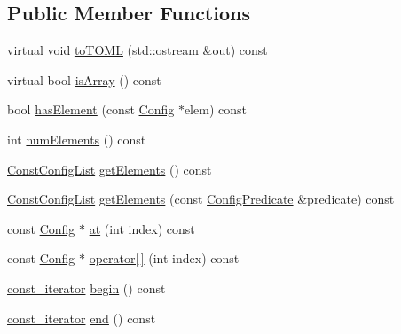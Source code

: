 \subsection*{Public Member Functions}
\begin{DoxyCompactItemize}
\item 
virtual void \hyperlink{classtheoria_1_1config_1_1ConfigArray_a1c73dba526ebd747682bc961676f5158}{to\+T\+O\+ML} (std\+::ostream \&out) const
\item 
virtual bool \hyperlink{classtheoria_1_1config_1_1ConfigArray_aa225cf405229bccfcfdf2042e44da4f7}{is\+Array} () const
\item 
bool \hyperlink{classtheoria_1_1config_1_1ConfigArray_a61157dd8ee35ba02a64859d5ccf59ba6}{has\+Element} (const \hyperlink{classtheoria_1_1config_1_1Config}{Config} $\ast$elem) const
\item 
int \hyperlink{classtheoria_1_1config_1_1ConfigArray_a8482627e5891b1c15f177f5118ec484d}{num\+Elements} () const
\item 
\hyperlink{classtheoria_1_1config_1_1Config_a61230728ffa4d92667a536c8c0f0ca30}{Const\+Config\+List} \hyperlink{classtheoria_1_1config_1_1ConfigArray_a91bf929f72cc8eeb399df049c5008898}{get\+Elements} () const
\item 
\hyperlink{classtheoria_1_1config_1_1Config_a61230728ffa4d92667a536c8c0f0ca30}{Const\+Config\+List} \hyperlink{classtheoria_1_1config_1_1ConfigArray_a45cf4c898888e5ec602d4f21ab603687}{get\+Elements} (const \hyperlink{classtheoria_1_1config_1_1Config_a293ebfd7146d935e232a066f7e6fa279}{Config\+Predicate} \&predicate) const
\item 
const \hyperlink{classtheoria_1_1config_1_1Config}{Config} $\ast$ \hyperlink{classtheoria_1_1config_1_1ConfigArray_a7200bc93265f3b9d9b5ea462fca4a0cb}{at} (int index) const
\item 
const \hyperlink{classtheoria_1_1config_1_1Config}{Config} $\ast$ \hyperlink{classtheoria_1_1config_1_1ConfigArray_a752c88b79f88e9cd5f6a887b1b6ed119}{operator\mbox{[}$\,$\mbox{]}} (int index) const
\item 
\hyperlink{classtheoria_1_1config_1_1ConfigArray_ace80948768681e7eb033825f4fe761f2}{const\+\_\+iterator} \hyperlink{classtheoria_1_1config_1_1ConfigArray_a21faee00f3613c6c36a044c7a37de609}{begin} () const
\item 
\hyperlink{classtheoria_1_1config_1_1ConfigArray_ace80948768681e7eb033825f4fe761f2}{const\+\_\+iterator} \hyperlink{classtheoria_1_1config_1_1ConfigArray_a5fca8609f50e2cfc41d75b0d6891c415}{end} () const
\end{DoxyCompactItemize}
